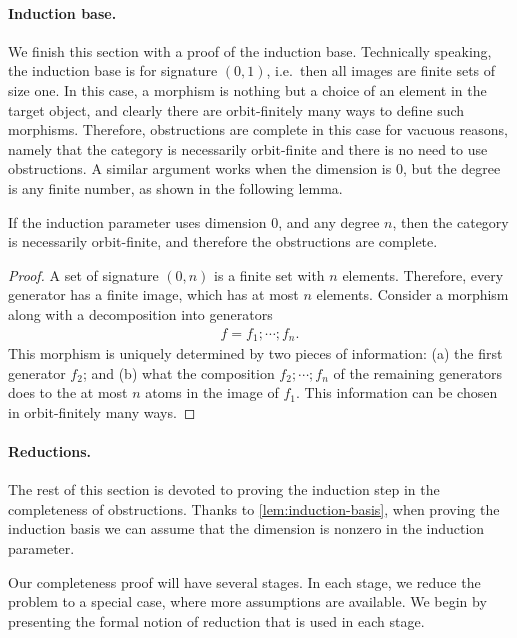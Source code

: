 \paragraph*{Induction base.}
We finish this section with a proof of the induction base. Technically speaking, the induction base is for signature $(0,1)$, i.e.~then all images are finite sets of size one. In this case, a morphism is nothing but a choice of an element in the target object, and clearly there are orbit-finitely many ways to define such morphisms. Therefore, obstructions are complete in this case for vacuous reasons, namely that the category is necessarily orbit-finite and there is no need to use obstructions. 
A similar argument works when the dimension is $0$, but the degree is any finite number, as shown in the following lemma. 
\begin{lemma}\label{lem:induction-basis}
        If the induction parameter uses dimension $0$, and any degree $n$, then the category is necessarily orbit-finite, and therefore the obstructions are complete.
\end{lemma}
\begin{proof}
    A set of signature $(0,n)$ is a finite set with $n$ elements. Therefore, every generator has a finite image, which has at most $n$ elements. Consider a morphism along with a decomposition into generators
    \begin{align*}
     f = f_1; \cdots ; f_n.     
    \end{align*}
    This morphism is uniquely determined by two pieces of information: (a) the first generator $f_2$; and (b) what the composition $f_2;\cdots ; f_n$ of the remaining generators does to the at most $n$ atoms in the image of $f_1$. This information can be chosen in orbit-finitely many ways. 
\end{proof}


\paragraph*{Reductions.}
The rest of this section is devoted to proving the induction step in the completeness of obstructions.
Thanks to \cref{lem:induction-basis}, when proving the induction basis we can assume that the dimension is nonzero in the induction parameter.

Our completeness proof will have several stages. In each stage, we reduce the problem to a special case, where more assumptions are available. We begin by presenting the formal notion of reduction that is used in each stage.

